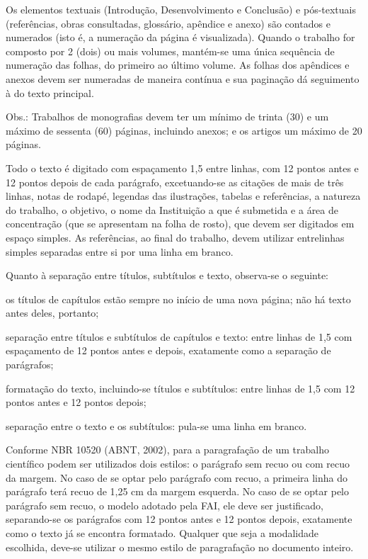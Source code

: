 \documentclass[a4paper,12pt]{article}  %
\begin{document}
\begin{ElementosTextuais}
\begin{Desenvolvimento}
Os elementos textuais (Introdução, Desenvolvimento e Conclusão) e pós-textuais (referências, obras consultadas, glossário, apêndice e anexo) são contados e numerados (isto é, a numeração da página é visualizada). Quando o trabalho for composto por 2 (dois) ou mais volumes, mantém-se uma única sequência de numeração das folhas, do primeiro ao último volume. As folhas dos apêndices e anexos devem ser numeradas de maneira contínua e sua paginação dá seguimento à do texto principal.

Obs.: Trabalhos de monografias devem ter um mínimo de trinta (30) e um máximo de sessenta (60) páginas, incluindo anexos; e os artigos um máximo de 20 páginas.

Todo o texto é digitado com espaçamento 1,5 entre linhas, com 12 pontos antes e 12 pontos depois de cada parágrafo, excetuando-se as citações de mais de três linhas, notas de rodapé, legendas das ilustrações, tabelas e referências, a natureza do trabalho, o objetivo, o nome da Instituição a que é submetida e a área de concentração (que se apresentam na folha de rosto), que devem ser digitados em espaço simples. As referências, ao final do trabalho, devem utilizar entrelinhas simples separadas entre si por uma linha em branco.

Quanto à separação entre títulos, subtítulos e texto, observa-se o seguinte:

\begin{alinea}
  \item os títulos de capítulos estão sempre no início de uma nova página; não há texto antes deles, portanto;
  \item separação entre títulos e subtítulos de capítulos e texto: entre linhas de 1,5 com espaçamento de 12 pontos antes e depois, exatamente como a separação de parágrafos;
  \item formatação do texto, incluindo-se títulos e subtítulos: entre linhas de 1,5 com 12 pontos antes e 12 pontos depois;
  \item separação entre o texto e os subtítulos: pula-se uma linha em branco.
\end{alinea}

Conforme NBR 10520 (ABNT, 2002), para a paragrafação de um trabalho científico podem ser utilizados dois estilos: o parágrafo sem recuo ou com recuo da margem. No caso de se optar pelo parágrafo com recuo, a primeira linha do parágrafo terá recuo de 1,25 cm da margem esquerda. No caso de se optar pelo parágrafo sem recuo, o modelo adotado pela FAI, ele deve ser justificado, separando-se os parágrafos com 12 pontos antes e 12 pontos depois, exatamente como o texto já se encontra formatado. Qualquer que seja a modalidade escolhida, deve-se utilizar o mesmo estilo de paragrafação no documento inteiro.


\end{Desenvolvimento}
\end{ElementosTextuais}
\end{document}
